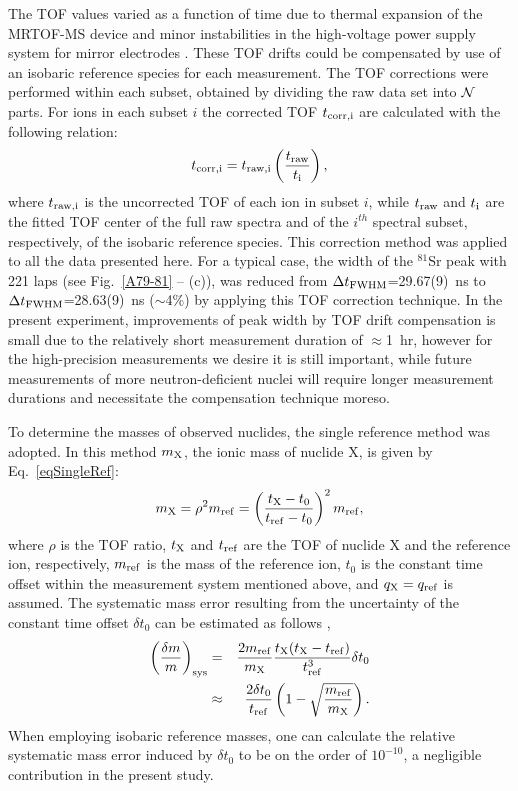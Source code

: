 \documentclass[3p]{elsarticle}
\begin{document}
The TOF values varied as a function of time due to thermal expansion of the MRTOF-MS device and minor instabilities in the high-voltage power supply system for mirror electrodes \citep{Schury2014}. These TOF drifts could be compensated by use of an isobaric reference species for each measurement. The TOF corrections were performed within each subset, obtained by dividing the raw data set into ${\cal N}$ parts. For ions in each subset $i$ the corrected TOF $t_{\rm corr,i}$ are calculated with the following relation:
\begin{equation}
t_{\rm corr,i} = t_{\rm raw,i} \left( \frac{t_{\rm raw}}{t_{\rm i}}\right),
\end{equation}
where $t_{\rm raw,i}$ is the uncorrected TOF of each ion in subset $i$, while $ t_{\rm raw}$ and $t_{\rm i}$ are the fitted TOF center of the full raw spectra and of the $i^{th}$ spectral subset, respectively, of the isobaric reference species. This correction method was applied to all the data presented here. For a typical case, the width of the $^{81}$Sr peak with 221 laps (see Fig.~\ref{A79-81} -- (c)), was reduced from $\Delta t_{\rm{FWHM}}$=29.67(9)~ns to $\Delta t_{\rm{FWHM}}$=28.63(9)~ns ($\sim$4\%) by applying this TOF correction technique. In the present experiment, improvements of peak width by TOF drift compensation is small due to the relatively short measurement duration of $\approx$1~hr, however for the high-precision measurements we desire it is still important, while future measurements of more neutron-deficient nuclei will require longer measurement durations and necessitate the compensation technique moreso. 

To determine the masses of observed nuclides, the single reference method was adopted. In this method $m_{\rm X}$, the ionic mass of nuclide X, is given by Eq.~\ref{eqSingleRef}:
\begin{equation}
m_{\rm X} = \rho^2 m_{\rm ref} = \left( \frac{t_{\rm X}-t_0}{t_{\rm ref}-t_0} \right)^2 m_{\rm ref},
\label{eqSingleRef}
\end{equation}
where $\rho$ is the TOF ratio, $t_{\rm X}$ and $t_{\rm ref}$ are the TOF of nuclide X and the reference ion, respectively, $m_{\rm ref}$ is the mass of the reference ion,  $t_0$ is the constant time offset within the measurement system mentioned above,  and $q_{\rm X} = q_{\rm ref}$ is assumed. The systematic mass error resulting from the uncertainty of the constant time offset $\delta t_0$ can be estimated as follows \citep{Itothesis},
\begin{eqnarray}
\left( \frac{\delta m}{m} \right)_{\rm sys}  &=& \frac{2m_{\rm ref}}{m_{\rm X}} \frac{t_{\rm X}(t_{\rm X}-t_{\rm ref})}{t_{\rm ref}^3}\delta t_0
 \nonumber \\
&\approx& \frac{2\delta t_0}{t_{\rm ref}} \left(1- \sqrt{\frac{m_{\rm ref}}{m_{\rm X}}} \right).
\end{eqnarray}
When employing isobaric reference masses, one can calculate the relative systematic mass error induced by $\delta t_0$ to be on the order of $10^{-10}$, a negligible contribution in the present study.
\end{document}
